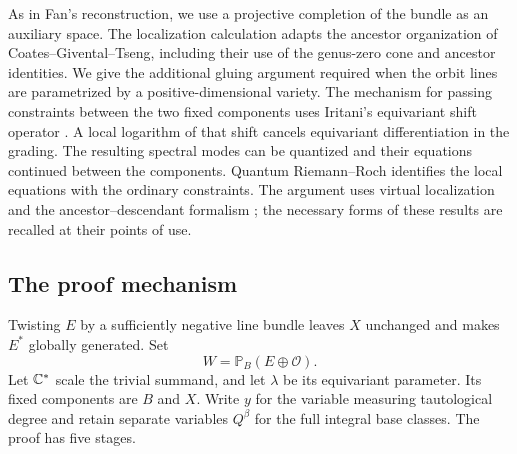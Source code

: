 As in Fan's reconstruction, we use a projective completion
of the bundle as an auxiliary space.
The localization calculation adapts the ancestor organization
of Coates--Givental--Tseng, including their use of the
genus-zero cone and ancestor identities. We give the
additional gluing argument required when the orbit lines
are parametrized by a positive-dimensional variety.
The mechanism for passing constraints between the two fixed
components uses Iritani's equivariant shift operator
\cite{IritaniShift}. A local logarithm of that shift
cancels equivariant differentiation in the grading.
The resulting spectral modes can be quantized and their
equations continued between the components.
Quantum Riemann--Roch \cite{QRR} identifies the local
equations with the ordinary constraints. The argument
uses virtual localization \cite{GP} and the
ancestor--descendant formalism
\cite{KontsevichManin,Getzler,GiventalQuant};
the necessary forms of these results are recalled at
their points of use.

\subsection{The proof mechanism}

Twisting $E$ by a sufficiently negative line bundle leaves
$X$ unchanged and makes $E^*$ globally generated.
Set
\[
 W=\mathbb P_B(E\oplus\mathcal O).
\]
Let $\mathbb C^*$ scale the trivial summand, and let $\lambda$
be its equivariant parameter. Its fixed components are
$B$ and $X$. Write $y$ for the variable measuring
tautological degree and retain separate variables $Q^\beta$
for the full integral base classes.
The proof has five stages.

